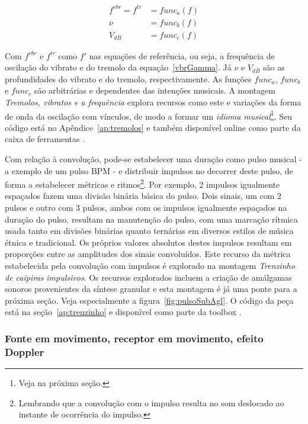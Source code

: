 \begin{equation}\label{eq:vinculos}
\begin{split}
f^{vbr} = f^{tr} & = func_a(f) \\
\nu & = func_b(f) \\
V_{dB} & = func_c(f)
\end{split}
\end{equation}

Com $f^{vbr}$ e $f^{tr}$ como $f'$ nas equações de referência, ou seja, a frequência
de oscilação do vibrato e do tremolo da equação~\ref{vbrGamma}. Já $\nu$ e $V_{dB}$ são as profundidades
do vibrato e do tremolo, respectivamente. As funções $func_a$,
$func_b$ e $func_c$ são arbitrárias e dependentes das intenções musicais. A montagem 
\emph{Tremolos, vibratos e a frequência} explora
recursos como este e variações da forma de onda da oscilação com vínculos, de modo a formar um \emph{idioma musical}\footnote{Veja na próxima seção.}. Seu código está no Apêndice~\ref{ap:tremolos} e também disponível online como parte da caixa de ferramentas \massa.


Com relação à convolução, pode-se estabelecer uma duração como pulso musical - a exemplo de um pulso BPM - 
e distribuir impulsos no decorrer deste pulso, de forma a estabelecer métricas e ritmos\footnote{Lembrando
que a convolução com o impulso resulta no som deslocado ao instante de ocorrência do impulso.}.
Por exemplo, 2 impulsos igualmente espaçados fazem uma
divisão binária básica do pulso. Dois sinais, um com 2 pulsos e outro com 3 pulsos,
ambos com os impulsos igualmente espaçados na duração do pulso, resultam na manutenção
do pulso, com uma marcação rítmica usada tanto em divisões binárias quanto ternárias em diversos
estilos de música étnica e tradicional.\cite{Gramani} 
Os próprios valores absolutos destes impulsos resultam em proporções entre as amplitudes dos sinais
convoluídos.
Este recurso da métrica
estabelecida pela convolução com impulsos é explorado na montagem \emph{Trenzinho de caipiras impulsivos}. Os recursos explorados incluem a criação de amálgamas sonoros provenientes da síntese granular e esta montagem é já uma ponte para a próxima seção. Veja especialmente a figura~\ref{fig:pulsoSubAgl}. O código da peça está na seção~\ref{ap:trenzinho} e disponível como parte da toolbox \massa.

\subsubsection{Fonte em movimento, receptor em movimento, efeito Doppler}

